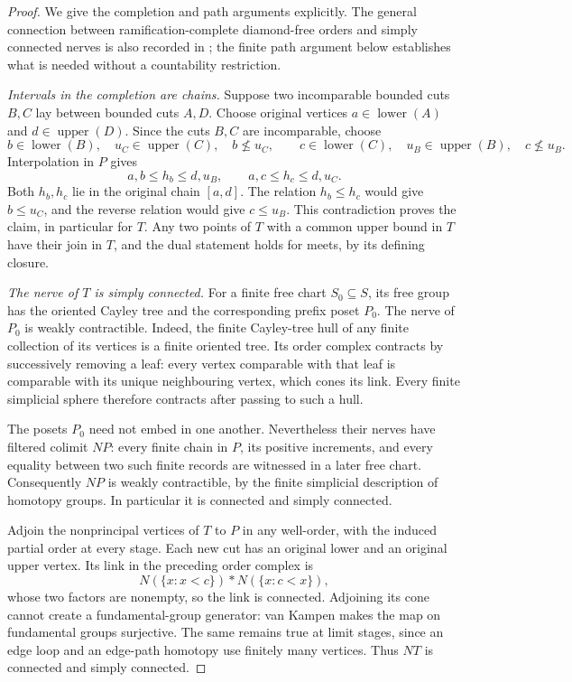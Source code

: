 \begin{proof}
We give the completion and path arguments explicitly. The general
connection between ramification-complete diamond-free orders and
simply connected nerves is also recorded in
\cite[Theorem~3.3.7]{GChen2014}; the finite path argument below
establishes what is needed without a countability restriction.

\emph{Intervals in the completion are chains.}
Suppose two incomparable bounded cuts $B,C$ lay between bounded
cuts $A,D$. Choose original vertices $a\in\operatorname{lower}(A)$
and $d\in\operatorname{upper}(D)$. Since the cuts $B,C$ are
incomparable, choose
\[
 b\in\operatorname{lower}(B),\quad
 u_C\in\operatorname{upper}(C),\quad b\not\le u_C,
 \qquad
 c\in\operatorname{lower}(C),\quad
 u_B\in\operatorname{upper}(B),\quad c\not\le u_B.
\]
Interpolation in $P$ gives
\[
 a,b\le h_b\le d,u_B,\qquad
 a,c\le h_c\le d,u_C.
\]
Both $h_b,h_c$ lie in the original chain $[a,d]$.
The relation $h_b\le h_c$ would give $b\le u_C$, and the reverse
relation would give $c\le u_B$. This contradiction proves the
claim, in particular for $T$. Any two points of $T$ with a common
upper bound in $T$ have their join in $T$, and the dual statement
holds for meets, by its defining closure.

\emph{The nerve of $T$ is simply connected.}
For a finite free chart $S_0\subseteq S$, its free group has the
oriented Cayley tree and the corresponding prefix poset $P_0$.
The nerve of $P_0$ is weakly contractible. Indeed, the finite
Cayley-tree hull of any finite collection of its vertices is a
finite oriented tree. Its order complex contracts by successively
removing a leaf: every vertex comparable with that leaf is
comparable with its unique neighbouring vertex, which cones its
link. Every finite simplicial sphere therefore contracts after
passing to such a hull.

The posets $P_0$ need not embed in one another. Nevertheless their
nerves have filtered colimit $NP$: every finite chain in $P$, its
positive increments, and every equality between two such finite
records are witnessed in a later free chart. Consequently $NP$
is weakly contractible, by the finite simplicial description of
homotopy groups. In particular it is connected and simply
connected.

Adjoin the nonprincipal vertices of $T$ to $P$ in any well-order,
with the induced partial order at every stage. Each new cut has
an original lower and an original upper vertex. Its link in the
preceding order complex is
\[
 N(\{x:x<c\})*N(\{x:c<x\}),
\]
whose two factors are nonempty, so the link is connected.
Adjoining its cone cannot create a fundamental-group generator:
van Kampen makes the map on fundamental groups surjective.
The same remains true at limit stages, since an edge loop and
an edge-path homotopy use finitely many vertices. Thus $NT$ is
connected and simply connected.


\end{proof}
